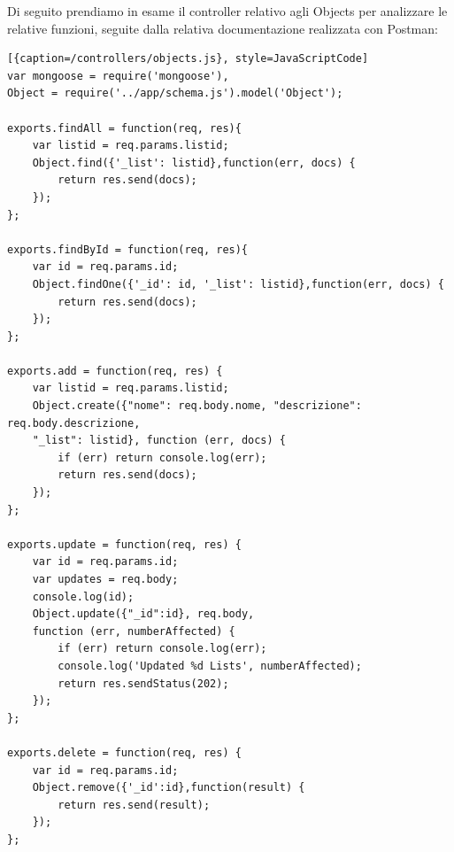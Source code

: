 Di seguito prendiamo in esame il controller relativo agli Objects per analizzare le relative funzioni, seguite dalla relativa documentazione realizzata con Postman:
\begin{lstlisting}[{caption=/controllers/objects.js}, style=JavaScriptCode]
var mongoose = require('mongoose'),
Object = require('../app/schema.js').model('Object');

exports.findAll = function(req, res){
	var listid = req.params.listid;
	Object.find({'_list': listid},function(err, docs) {
		return res.send(docs);
	});
};

exports.findById = function(req, res){
	var id = req.params.id;
	Object.findOne({'_id': id, '_list': listid},function(err, docs) {
		return res.send(docs);
	});
};

exports.add = function(req, res) {
	var listid = req.params.listid;
	Object.create({"nome": req.body.nome, "descrizione": req.body.descrizione, 
	"_list": listid}, function (err, docs) {
		if (err) return console.log(err);
		return res.send(docs);
	});
};

exports.update = function(req, res) {
	var id = req.params.id;
	var updates = req.body;
	console.log(id);
	Object.update({"_id":id}, req.body,
	function (err, numberAffected) {
		if (err) return console.log(err);
		console.log('Updated %d Lists', numberAffected);
		return res.sendStatus(202);
	});
};

exports.delete = function(req, res) {
	var id = req.params.id;
	Object.remove({'_id':id},function(result) {
		return res.send(result);
	});
};
\end{lstlisting}


